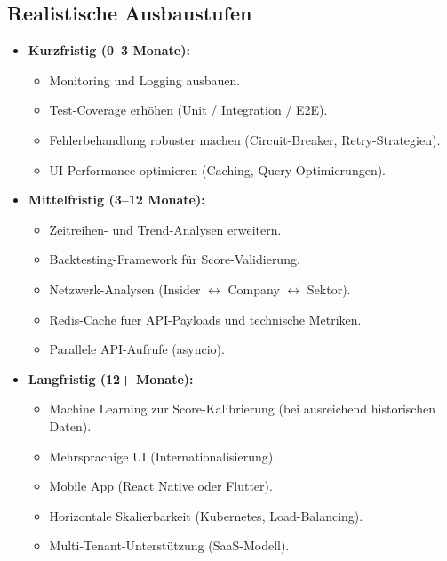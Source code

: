 \subsection{Realistische Ausbaustufen}
\begin{itemize}
  \item \textbf{Kurzfristig (0--3 Monate):}
    \begin{itemize}
      \item Monitoring und Logging ausbauen.
      \item Test-Coverage erhöhen (Unit / Integration / E2E). %
      \item Fehlerbehandlung robuster machen (Circuit-Breaker, Retry-Strategien).
      \item UI-Performance optimieren (Caching, Query-Optimierungen).
    \end{itemize}
  \item \textbf{Mittelfristig (3--12 Monate):}
    \begin{itemize}
      \item Zeitreihen- und Trend-Analysen erweitern.
      \item Backtesting-Framework für Score-Validierung.
      \item Netzwerk-Analysen (Insider $\leftrightarrow$ Company $\leftrightarrow$ Sektor).
      \item Redis-Cache fuer API-Payloads und technische Metriken.
      \item Parallele API-Aufrufe (asyncio).
    \end{itemize}
  \item \textbf{Langfristig (12+ Monate):}
    \begin{itemize}
      \item Machine Learning zur Score-Kalibrierung (bei ausreichend historischen Daten).
      \item Mehrsprachige UI (Internationalisierung).
      \item Mobile App (React Native oder Flutter).
      \item Horizontale Skalierbarkeit (Kubernetes, Load-Balancing).
      \item Multi-Tenant-Unterstützung (SaaS-Modell).
    \end{itemize}
\end{itemize}

